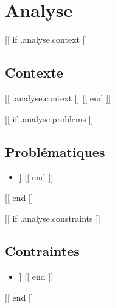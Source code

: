 \section{Analyse}

[[ if .analyse.context ]]
\subsection{Contexte}
[[ .analyse.context ]]
[[ end ]]

[[ if .analyse.problems ]]
\subsection{Problématiques}
\begin{itemize}
[[ range .analyse.problems ]]
    \item [[ . ]]
[[ end ]]
\end{itemize}
[[ end ]]

[[ if .analyse.constraints ]]
\subsection{Contraintes}
\begin{itemize}
[[ range .analyse.constraints ]]
    \item [[ . ]]
[[ end ]]
\end{itemize}
[[ end ]]
